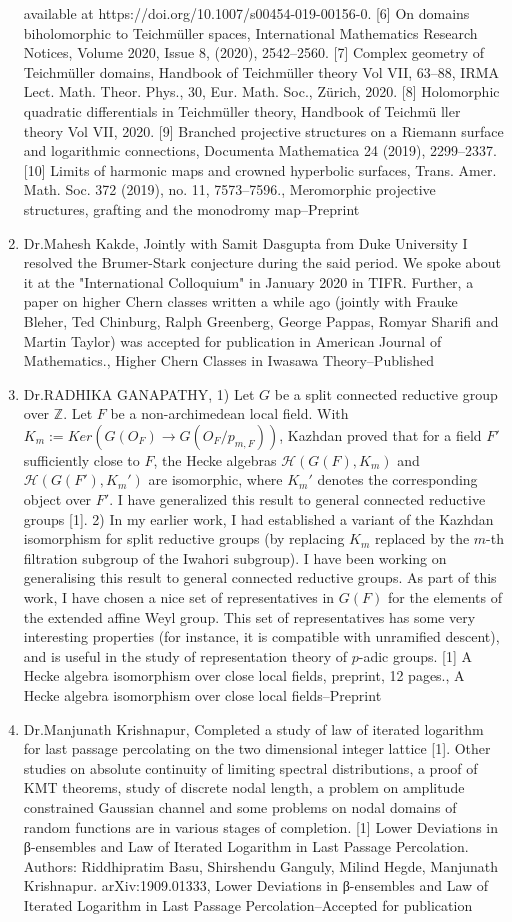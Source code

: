 \begin{enumerate}
available at https://doi.org/10.1007/s00454-019-00156-0. [6] On domains biholomorphic to Teichmüller spaces, International Mathematics Research Notices, Volume 2020, Issue 8, (2020), 2542–2560. [7] Complex geometry of Teichmüller domains, Handbook of Teichmüller theory Vol VII, 63–88, IRMA Lect. Math. Theor. Phys., 30, Eur. Math. Soc., Zürich, 2020. [8] Holomorphic quadratic differentials in Teichmüller theory, Handbook of Teichmü ller theory Vol VII, 2020. [9] Branched projective structures on a Riemann surface and logarithmic connections, Documenta Mathematica 24 (2019), 2299–2337. [10] Limits of harmonic maps and crowned hyperbolic surfaces, Trans. Amer. Math. Soc. 372 (2019), no. 11, 7573–7596., Meromorphic projective structures, grafting and the monodromy map--Preprint
\item Dr.Mahesh Kakde, Jointly with Samit Dasgupta from Duke University I resolved the Brumer-Stark conjecture during the said period. We spoke about it at the "International Colloquium" in January 2020 in TIFR. Further, a paper on higher Chern classes written a while ago (jointly with Frauke Bleher, Ted Chinburg,  Ralph Greenberg, George Pappas, Romyar Sharifi and Martin Taylor) was accepted for publication in American Journal of Mathematics., Higher Chern Classes in Iwasawa Theory--Published
\item Dr.RADHIKA GANAPATHY, 1) Let $G$ be a split connected reductive group over $\mathbb{Z}$. Let $F$ be a non-archimedean local field. With $K_m := Ker(G(O_F ) → G(O_F /p_{m,F} ))$, Kazhdan proved that for a field $F′$ sufficiently close to $F$, the Hecke algebras $\mathcal{H}(G(F), K_m)$ and $\mathcal{H}(G(F′), K_m′ )$ are isomorphic, where $K_m′$ denotes the corresponding object over $F′$. I have generalized this result to general connected reductive groups [1].  2) In my earlier work, I had established  a variant of the Kazhdan isomorphism for split reductive groups (by replacing $K_m$ replaced by the $m$-th filtration subgroup of the Iwahori subgroup). I have been working on generalising this result to general connected reductive groups. As part of this work, I have chosen a nice set of representatives in $G(F)$ for the elements of the extended affine Weyl group. This set of representatives has some very interesting properties (for instance, it is compatible with unramified descent), and is useful in the study of representation theory of $p$-adic groups.   [1] A Hecke algebra isomorphism over close local fields, preprint, 12 pages., A Hecke algebra isomorphism over close local fields--Preprint
\item Dr.Manjunath Krishnapur, Completed a study of law of iterated logarithm for last passage percolating on the two dimensional integer lattice [1]. Other studies on absolute continuity of limiting spectral distributions, a proof of KMT theorems, study of discrete nodal length, a problem on amplitude constrained Gaussian channel and some problems on nodal domains of random functions are in various stages of completion.  [1] Lower Deviations in β-ensembles and Law of Iterated Logarithm in Last Passage Percolation.   Authors: Riddhipratim Basu, Shirshendu Ganguly, Milind Hegde, Manjunath Krishnapur. arXiv:1909.01333, Lower Deviations in β-ensembles and Law of Iterated Logarithm in Last Passage Percolation--Accepted for publication

\end{enumerate}
